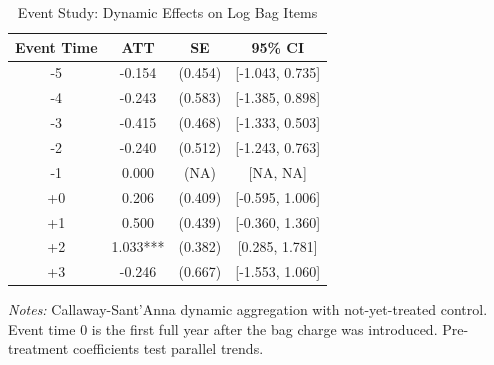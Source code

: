 \begin{table}[htbp]
\centering
\begin{threeparttable}
\caption{Event Study: Dynamic Effects on Log Bag Items}
\label{tab:eventstudy}
\begin{tabular}{cccc}
\toprule
Event Time & ATT & SE & 95\% CI \\
\midrule
-5 & -0.154 & (0.454) & [-1.043, 0.735] \\
-4 & -0.243 & (0.583) & [-1.385, 0.898] \\
-3 & -0.415 & (0.468) & [-1.333, 0.503] \\
-2 & -0.240 & (0.512) & [-1.243, 0.763] \\
-1 & 0.000 & (NA) & [NA, NA] \\
+0 & 0.206 & (0.409) & [-0.595, 1.006] \\
+1 & 0.500 & (0.439) & [-0.360, 1.360] \\
+2 & 1.033*** & (0.382) & [0.285, 1.781] \\
+3 & -0.246 & (0.667) & [-1.553, 1.060] \\
\bottomrule
\end{tabular}
\begin{tablenotes}[flushleft]
\small
\item \textit{Notes:} Callaway-Sant'Anna dynamic aggregation with not-yet-treated control. Event time 0 is the first full year after the bag charge was introduced. Pre-treatment coefficients test parallel trends.
\end{tablenotes}
\end{threeparttable}
\end{table}
